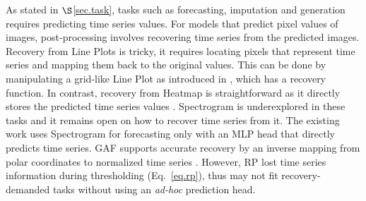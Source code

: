 



\vspace{0.2cm}

 As stated in $\S$\ref{sec.task}, tasks such as forecasting, imputation and generation requires predicting time series values. For models that predict pixel values of images, post-processing involves recovering time series from the predicted images. Recovery from Line Plots is tricky, it requires locating pixels that %
represent time series and mapping them back to the original values. This can be done by manipulating a grid-like Line Plot as introduced in \cite{yang2023your,yang2024vitime}, which has a recovery function. In contrast, recovery from Heatmap is straightforward as it directly stores the predicted time series values \cite{zeng2021deep,chen2024visionts}. Spectrogram is underexplored in these tasks and it remains open on how to recover time series from it. The existing work \cite{zeng2023pixels} uses Spectrogram for forecasting only with an MLP head that directly predicts time series. %
GAF supports accurate recovery by an inverse mapping from polar coordinates to normalized time series \cite{wang2015imaging}. However, RP lost time series information during thresholding (Eq.~\ref{eq.rp}), thus may not fit recovery-demanded tasks without using an {\em ad-hoc} prediction head.








